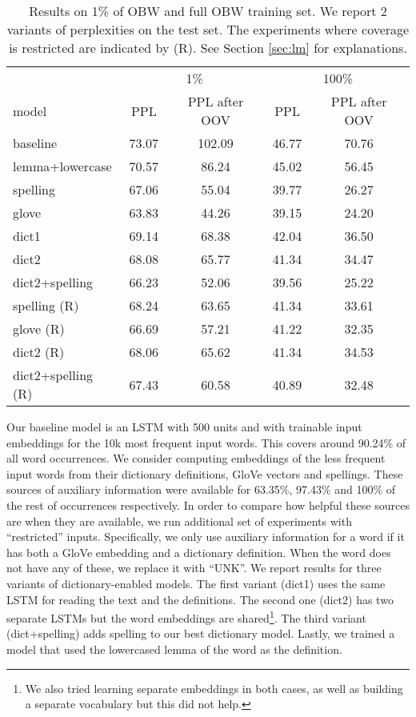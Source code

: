 \begin{table}
\caption{\label{table:obw}Results on 1\% of OBW and full OBW training set. We report 2 variants of perplexities on the test set. The experiments where coverage is restricted are indicated by (R). See Section \ref{sec:lm} for explanations.
}
    \centering
    \begin{tabular}{lcccc}
    \toprule
      & \multicolumn{2}{c}{1\%} & \multicolumn{2}{c}{100\%} \\
      model & PPL & PPL after OOV & PPL & PPL after OOV \\
    \midrule
      baseline & 73.07 & 102.09 & 46.77 & 70.76 \\
    \midrule
      lemma+lowercase & 70.57 & 86.24  & 45.02 & 56.45 \\
      spelling & 67.06 & 55.04 & 39.77 & 26.27 \\
      glove & 63.83 & 44.26 & 39.15 & 24.20 \\
      dict1 & 69.14 & 68.38 & 42.04 & 36.50 \\
      dict2 & 68.08 & 65.77 & 41.34 & 34.47 \\
      dict2+spelling & 66.23 & 52.06 & 39.56 & 25.22 \\ 
    \midrule
spelling (R) & 68.24 & 63.65 & 41.34 & 33.61 \\
      glove (R) & 66.69 & 57.21 & 41.22 & 32.35 \\
      dict2 (R) & 68.06 & 65.62 & 41.34 & 34.53 \\
      dict2+spelling (R) & 67.43 & 60.58 & 40.89 & 32.48 \\
    \bottomrule
    \end{tabular}
\end{table}

Our baseline model is an LSTM with 500 units and with trainable input embeddings for the 10k most frequent input words. This covers around 90.24\% of all word occurrences. We consider computing embeddings of the less frequent input words from their dictionary definitions, GloVe vectors and spellings. These sources of auxiliary information were available for 63.35\%, 97.43\% and 100\% of the rest of occurrences respectively. In order to compare how helpful these sources are when they are available, we run additional set of experiments with ``restricted'' inputs. Specifically, we only use auxiliary information for a word if it has both a GloVe embedding and a dictionary definition. When the word does not have any of these, we replace it with ``UNK''. We report results for three variants of dictionary-enabled models. The first variant (dict1) uses the same LSTM for reading the text and the definitions. The second one (dict2) has two separate LSTMs but the word embeddings are shared\footnote{We also tried learning separate embeddings in both cases, as well as building a separate vocabulary but this did not help.}. The third variant (dict+spelling) adds spelling to our best dictionary model. Lastly, we trained a model that used the lowercased lemma of the word as the definition. 



